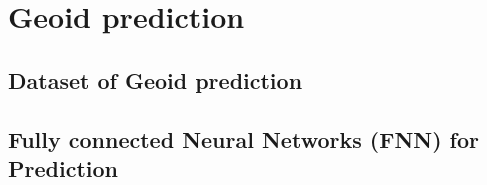 \chapter{Geoid prediction}\label{chap:content}

\section{Dataset of Geoid prediction}

\section{Fully connected Neural Networks (FNN) for Prediction}




